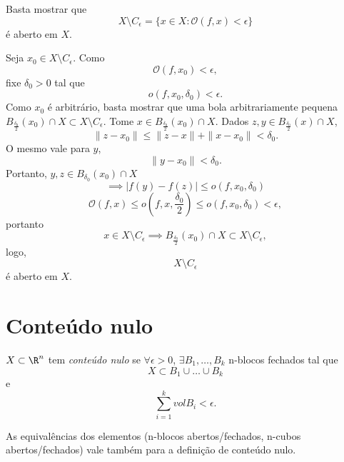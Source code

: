 \begin{demo}
    Basta mostrar que \[
    X \setminus C_{\epsilon} = \{x\in X : \mathcal{O}\left( f, x \right) <\epsilon\} 
    \] é aberto em $X$.

    Seja $x_0\in X\setminus C_{\epsilon}$. Como \[
	\mathcal{O}\left( f,x_0 \right) <\epsilon
    ,\] fixe $\delta_0 > 0$ tal que \[
    o\left( f, x_0, \delta_0 \right) < \epsilon
    .\] Como $x_0$ é arbitrário, basta mostrar que uma bola arbitrariamente pequena $B_{\frac{\delta_0}{2}}\left( x_0 \right) \cap X \subset X\setminus C_\epsilon$. Tome $x\in B_{\frac{\delta_0}{2}}\left( x_0 \right) \cap X$. Dados $z,y \in B_{\frac{\delta_0}{2}}\left( x \right) \cap X$, \[
    \|z-x_0\| \le \|z-x\|+\|x-x_0\| < \delta_0
    .\] O mesmo vale para $y$, \[
    \|y-x_0\| < \delta_0
    .\] Portanto, $y,z \in  B_{\delta_0}\left( x_0 \right) \cap X$ \[
    \implies \left| f\left( y \right) -f\left( z \right)  \right| \le o\left( f, x_0, \delta_0 \right) 
    \] \[
    \mathcal{O}\left( f,x \right) \le o \left(  f, x, \frac{\delta_0}{2}\right) \le o\left(  f, x_0,\delta_0\right)  < \epsilon
    ,\] portanto \[
    x\in X\setminus C_\epsilon \implies B_{\frac{\delta_0}{2}}\left( x_0 \right) \cap X \subset X\setminus C_{\epsilon}
    ,\] logo,  \[
    X \setminus C_{\epsilon}
    \]  é aberto em $X$.
\end{demo}

\section*{Conteúdo nulo}

\begin{definition}
    $X\subset \R^{n}$ tem \emph{conteúdo nulo} se $\forall \epsilon>0$, $\exists B_1,\ldots, B_k$ n-blocos fechados tal que \[
    X\subset B_1\cup \ldots\cup B_k
    \] e \[
    \sum_{i=1}^{k} vol B_i < \epsilon
    .\] 
\end{definition}

\begin{note}
    As equivalências dos elementos (n-blocos abertos/fechados, n-cubos abertos/fechados) vale também para a definição de conteúdo nulo.
\end{note}

